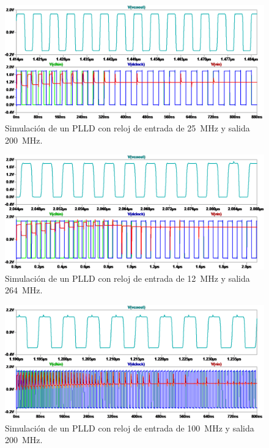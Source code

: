 \documentclass[a4paper]{article}
\begin{document}
\begin{figure}[!htb]
\centering
\includegraphics[scale=0.4]{./img/pfd_plld_25Min_200Mout}
\caption{Simulación de un PLLD con reloj de entrada de \SI{25}{\mega\hertz} y salida \SI{200}{\mega\hertz}.}
\label{fig:pfd_plld_25Min_200Mout}
\end{figure}

\begin{figure}[!htb]
\centering
\includegraphics[scale=0.4]{./img/pfd_plld_12Min_264Mout}
\caption{Simulación de un PLLD con reloj de entrada de \SI{12}{\mega\hertz} y salida \SI{264}{\mega\hertz}.}
\label{fig:pfd_plld_12Min_264Mout}
\end{figure}

\begin{figure}[!htb]
\centering
\includegraphics[scale=0.4]{./img/pfd_plld_100Min_200Mout}
\caption{Simulación de un PLLD con reloj de entrada de \SI{100}{\mega\hertz} y salida \SI{200}{\mega\hertz}.}
\label{fig:pfd_plld_100Min_200Mout}
\end{figure}
\end{document}
